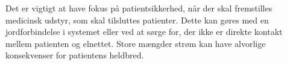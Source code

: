 Det er vigtigt at have fokus på patientsikkerhed, når der skal fremstilles medicinsk udstyr, som skal tilsluttes patienter. Dette kan gøres med en jordforbindelse i systemet eller ved at sørge for, der ikke er direkte kontakt mellem patienten og elnettet. Store mængder strøm kan have alvorlige konsekvenser for patientens heldbred. 


